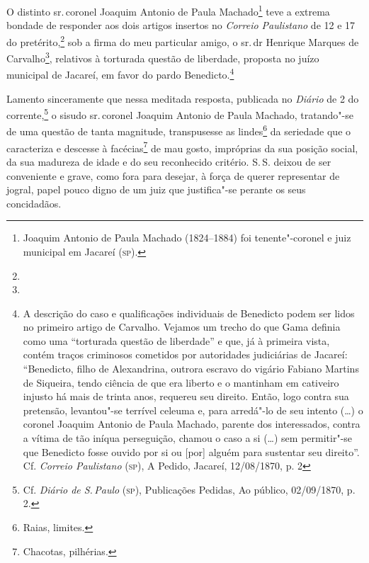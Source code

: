 O distinto sr.\,coronel Joaquim Antonio de Paula Machado\footnote{
  Joaquim Antonio de Paula Machado (1824--1884) foi tenente"-coronel e
  juiz municipal em Jacareí (\textsc{sp}).} teve a extrema bondade de responder
aos dois artigos insertos no \emph{Correio Paulistano} de 12 e 17 do
pretérito,\footnote{} sob a firma do meu
particular amigo, o sr.\,dr Henrique Marques de Carvalho\footnote{}, relativos à torturada questão de liberdade, proposta no
juízo municipal de Jacareí, em favor do pardo Benedicto.\footnote{A
  descrição do caso e qualificações individuais de Benedicto podem ser
  lidos no primeiro artigo de Carvalho. Vejamos um trecho do que Gama
  definia como uma ``torturada questão de liberdade'' e que, já à primeira
  vista, contém traços criminosos cometidos por autoridades judiciárias
  de Jacareí: ``Benedicto, filho de Alexandrina, outrora escravo do
  vigário Fabiano Martins de Siqueira, tendo ciência de que era liberto
  e o mantinham em cativeiro injusto há mais de trinta anos, requereu
  seu direito. Então, logo contra sua pretensão, levantou"-se terrível
  celeuma e, para arredá"-lo de seu intento (\ldots{}) o coronel Joaquim
  Antonio de Paula Machado, parente dos interessados, contra a vítima de
  tão iníqua perseguição, chamou o caso a si (\ldots{}) sem permitir"-se que
  Benedicto fosse ouvido por si ou {[}por{]} alguém para sustentar seu
  direito''. Cf. \emph{Correio Paulistano} (\textsc{sp}), A Pedido, Jacareí,
  12/08/1870, p. 2}

Lamento sinceramente que nessa meditada resposta, publicada no
\emph{Diário} de 2 do corrente,\footnote{Cf. \emph{Diário de S.\,Paulo}
  (\textsc{sp}), Publicações Pedidas, Ao público, 02/09/1870, p. 2.} o sisudo sr.\,coronel Joaquim Antonio de Paula Machado, tratando"-se de uma questão de
tanta magnitude, transpusesse as lindes\footnote{Raias, limites.} da
seriedade que o caracteriza e descesse à facécias\footnote{Chacotas,
  pilhérias.} de mau gosto, impróprias da sua posição social, da sua
madureza de idade e do seu reconhecido critério. S.\,S. deixou de ser
conveniente e grave, como fora para desejar, à força de querer
representar de jogral, papel pouco digno de um juiz que justifica"-se
perante os seus concidadãos.

